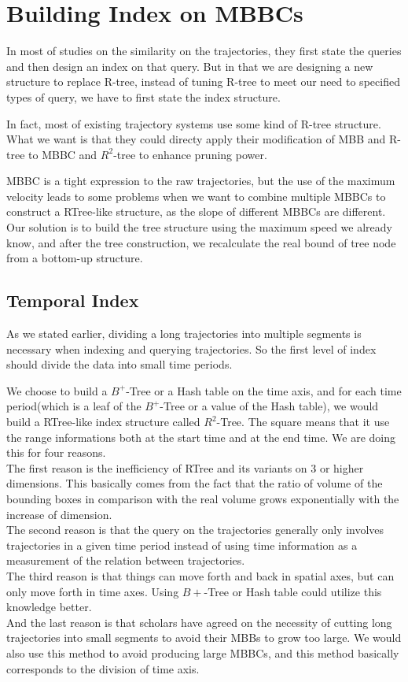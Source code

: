 \documentclass[sigplan]{acmart}
\begin{document}
\section{Building Index on MBBCs}
In most of studies on the similarity on the trajectories, they first state the queries and then design an index on that query. But in that we are designing a new structure to replace R-tree, instead of tuning R-tree to meet our need to specified types of query, we have to first state the index structure.\par
In fact, most of existing trajectory systems use some kind of R-tree structure. What we want is that they could directy apply their modification of MBB and R-tree to MBBC and $R^2$-tree to enhance pruning power.\par
MBBC is a tight expression to the raw trajectories, but the use of the maximum velocity leads to some problems when we want to combine multiple MBBCs to construct a RTree-like structure, as the slope of different MBBCs are different. Our solution is to build the tree structure using the maximum speed we already know, and after the tree construction, we recalculate the real bound of tree node from a bottom-up structure.\par
\subsection{Temporal Index}
As we stated earlier, dividing a long trajectories into multiple segments is necessary when indexing and querying trajectories. So the first level of index should divide the data into small time periods.\par
We choose to build a $B^+ $-Tree or a Hash table on the time axis, and for each time period(which is a leaf of the $B^+ $-Tree or a value of the Hash table), we would build a RTree-like index structure called $R^2$-Tree. The square means that it use the range informations both at the start time and at the end time. We are doing this for four reasons.\\
\indent The first reason is the inefficiency of RTree and its variants on 3 or higher dimensions. This basically comes from the fact that the ratio of volume of the bounding boxes in comparison with the real volume grows exponentially with the increase of dimension.\\
\indent The second reason is that the query on the trajectories generally only involves trajectories in a given time period instead of using time information as a measurement of the relation between trajectories.\\
\indent The third reason is that things can move forth and back in spatial axes, but can only move forth in time axes. Using $B+ $-Tree or Hash table could utilize this knowledge better.\\
\indent And the last reason is that scholars have agreed on the necessity of cutting long trajectories into small segments to avoid their MBBs to grow too large. We would also use this method to avoid producing large MBBCs, and this method basically corresponds to the division of time axis.\par
\end{document}
